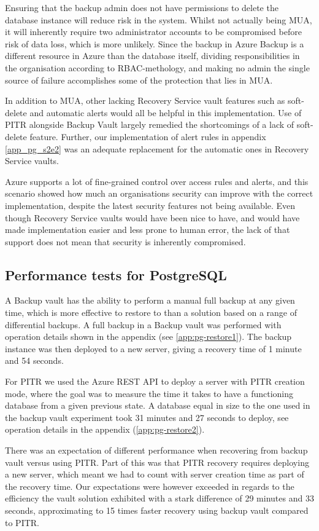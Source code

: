 Ensuring that the backup admin does not have permissions to delete the database instance will reduce risk in the system. Whilst not actually being MUA, it will inherently require two administrator accounts to be compromised before risk of data loss, which is more unlikely. Since the backup in Azure Backup is a different resource in Azure than the database itself, dividing responsibilities in the organisation according to RBAC-methology, and making no admin the single source of failure accomplishes some of the protection that lies in MUA.

In addition to MUA, other lacking Recovery Service vault features such as soft-delete and automatic alerts would all be helpful in this implementation. Use of PITR alongside Backup Vault largely remedied the shortcomings of a lack of soft-delete feature. Further, our implementation of alert rules in appendix \ref{app_pg_s2e2} was an adequate replacement for the automatic ones in Recovery Service vaults. 

Azure supports a lot of fine-grained control over access rules and alerts, and this scenario showed how much an organisations security can improve with the correct implementation, despite the latest security features not being available. Even though Recovery Service vaults would have been nice to have, and would have made implementation easier and less prone to human error, the lack of that support does not mean that security is inherently compromised.

\subsection{Performance tests for PostgreSQL}
A Backup vault has the ability to perform a manual full backup at any given time, which is more effective to restore to than a solution based on a range of differential backups. A full backup in a Backup vault was performed with operation details shown in the appendix (see \ref{app:pg-restore1}). The backup instance was then deployed to a new server, giving a recovery time of 1 minute and 54 seconds.

For PITR we used the Azure REST API to deploy a server with PITR creation mode, where the goal was to measure the time it takes to have a functioning database from a given previous state. A database equal in size to the one used in the backup vault experiment took 31 minutes and 27 seconds to deploy, see operation details in the appendix (\ref{app:pg-restore2}). 

There was an expectation of different performance when recovering from backup vault versus using PITR. Part of this was that PITR recovery requires deploying a new server, which meant we had to count with server creation time as part of the recovery time. Our expectations were however exceeded in regards to the efficiency the vault solution exhibited with a stark difference of 29 minutes and 33 seconds, approximating to 15 times faster recovery using backup vault compared to PITR.

